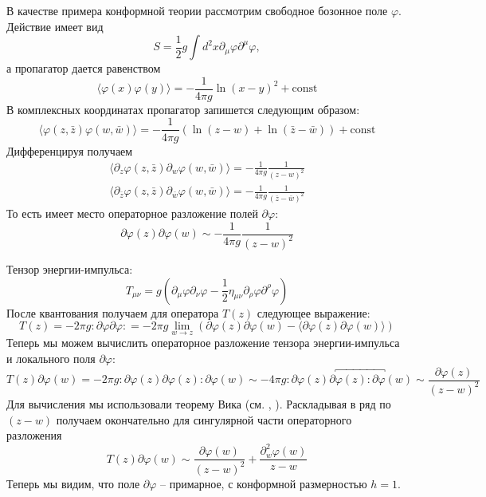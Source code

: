 \documentclass[a4paper,12pt]{article}
\theoremstyle{definition}
\theoremstyle{definition}
\theoremstyle{definition}
\begin{document}
В качестве примера конформной теории рассмотрим свободное бозонное поле $\varphi$. Действие имеет вид
\begin{equation}
  \label{eq:254}
  S=\frac{1}{2} g \int d^{2}x \partial_{\mu}\varphi \partial^{\mu}\varphi,
\end{equation}
а пропагатор дается равенством
\begin{equation}
  \label{eq:255}
  \langle\varphi(x) \varphi(y)\rangle =-\frac{1}{4\pi g} \ln (x-y)^{2}+\text{const}
\end{equation}
В комплексных координатах пропагатор запишется следующим образом:
\begin{equation}
  \label{eq:256}
  \langle \varphi(z,\bar z) \varphi(w,\bar w)\rangle =-\frac{1}{4\pi g} \left( \ln(z-w) + \ln(\bar z -\bar w)\right) +\text{const}
\end{equation}
Дифференцируя получаем
\begin{eqnarray}
  \label{eq:257}
  \langle\partial_{z} \varphi(z,\bar z) \partial_{w}\varphi(w,\bar w)\rangle =-\frac{1}{4\pi g} \frac{1}{(z-w)^{2}}\\
  \langle\partial_{\bar z} \varphi(z,\bar z) \partial_{\bar w}\varphi(w,\bar w)\rangle =-\frac{1}{4\pi g} \frac{1}{(\bar z-\bar w)^{2}}  
\end{eqnarray}
То есть имеет место операторное разложение полей $\partial \varphi$:
\begin{equation}
  \label{eq:259}
  \partial \varphi(z) \partial \varphi(w) \sim -\frac{1}{4 \pi g} \frac{1}{(z-w)^{2}}
\end{equation}

Тензор энергии-импульса:
\begin{equation}
  \label{eq:258}
  T_{\mu\nu}=g \left(\partial_{\mu}\varphi \partial_{\nu} \varphi -\frac{1}{2} \eta_{\mu\nu}\partial_{\rho}\varphi \partial^{\rho} \varphi \right)
\end{equation}
После квантования получаем для оператора $T(z)$ следующее выражение:
\begin{equation}
  \label{eq:260}
  T(z) =-2\pi g :\partial \varphi \partial \varphi : =-2\pi g \lim_{w\to z} \left(\partial \varphi(z) \partial \varphi(w) -\langle\partial \varphi(z) \partial \varphi(w)\rangle\right)
\end{equation}
Теперь мы можем вычислить операторное разложение тензора энергии-импульса и локального поля $\partial \varphi$:
\begin{equation}
  \label{eq:261}
  T(z)\partial \varphi(w)=-2\pi g :\partial \varphi(z) \partial \varphi(z): \partial \varphi(w) \sim -4\pi g:\partial \varphi(z)  \partial \overbracket{ \varphi(z): \partial \varphi } (w) \sim \frac{\partial \varphi (z)}{(z-w)^{2}}
\end{equation}
Для вычисления мы использовали теорему Вика (см. \cite{vasiliev1998}, \cite{difrancesco1997cft}). Раскладывая в ряд по $(z-w)$ получаем окончательно для сингулярной части операторного разложения
\begin{equation}
  \label{eq:262}
  T(z) \partial \varphi(w) \sim \frac{\partial \varphi(w) }{(z-w)^{2}} +\frac{\partial_{w}^{2} \varphi(w)}{z-w}
\end{equation}
Теперь мы видим, что поле $\partial \varphi$ -- примарное, с конформной размерностью $h=1$. 
\end{document}
